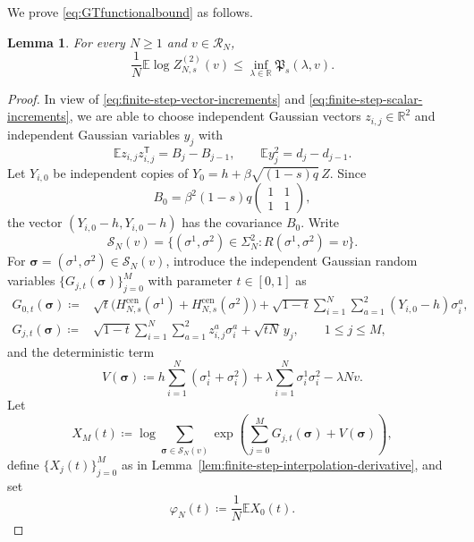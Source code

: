\documentclass[11pt]{article}
\newtheorem{lemma}[theorem]{Lemma}
\numberwithin{equation}{section}
\newcommand{\E}{\mathbb{E}}
\newcommand{\1}{\mathbf 1}
\begin{document}
We prove \eqref{eq:GTfunctionalbound} as follows.

\begin{lemma}
\label{lem:specialGT}
For every $N\geq1$ and $v\in\mathcal R_N$,
\begin{equation}
\frac1N\E\log Z_{N,s}^{(2)}(v)
\leq\inf_{\lambda\in\mathbb R}\mathfrak P_s(\lambda,v).
\label{eq:appendix-GT-infimum}
\end{equation}
\end{lemma}

\begin{proof}
In view of \eqref{eq:finite-step-vector-increments} and \eqref{eq:finite-step-scalar-increments}, we are able to choose independent Gaussian vectors $z_{i,j}\in\mathbb R^2$ and
independent Gaussian variables $y_j$ with
\begin{equation}\label{eq:covzy}
\E z_{i,j}z_{i,j}^{\mathsf T}=B_j-B_{j-1},
\qquad
\E y_j^2=d_j-d_{j-1}.
\end{equation}
Let $Y_{i,0}$ be independent copies of
$Y_0=h+\beta\sqrt{(1-s)q}\,Z$. Since
\[
B_0=\beta^2(1-s)q
\begin{pmatrix}1&1\\1&1\end{pmatrix},
\]
the vector $(Y_{i,0}-h,Y_{i,0}-h)$ has the covariance $B_0$.
Write
\[
{\mathcal{S}}_N(v)=\{(\sigma^1,\sigma^2)\in\Sigma_N^2:
R(\sigma^1,\sigma^2)=v\}.
\]
For $\boldsymbol\sigma=(\sigma^1,\sigma^2)\in{\mathcal{S}}_N(v)$, introduce
the independent Gaussian random variables $\{ G_{j,t}(\boldsymbol\sigma)\} _{j=0}^M$ with parameter $t \in [0,1]$ as
\begin{align*}
G_{0,t}(\boldsymbol\sigma)
\coloneqq {}&\sqrt t\bigl(H_{N,s}^{\mathrm{cen}}(\sigma^1)
+H_{N,s}^{\mathrm{cen}}(\sigma^2)\bigr)+\sqrt{1-t}\sum_{i=1}^N\sum_{a=1}^2
(Y_{i,0}-h)\sigma_i^a,\\
G_{j,t}(\boldsymbol\sigma)
\coloneqq {}&\sqrt{1-t}\sum_{i=1}^N\sum_{a=1}^2z_{i,j}^a\sigma_i^a
+\sqrt{tN}\,y_j,
\qquad 1\leq j\leq M,
\end{align*}
and the deterministic term
\[
V(\boldsymbol\sigma) \coloneqq h\sum_{i=1}^N(\sigma_i^1+\sigma_i^2)
+\lambda\sum_{i=1}^N\sigma_i^1\sigma_i^2-\lambda Nv.
\]
Let
\[
X_M(t) \coloneqq \log\sum_{\boldsymbol\sigma\in{\mathcal{S}}_N(v)}
\exp\left(\sum_{j=0}^MG_{j,t}(\boldsymbol\sigma)
+V(\boldsymbol\sigma)\right),
\]
define $\{ X_j(t)\} _{j=0}^M$ as in Lemma~\ref{lem:finite-step-interpolation-derivative},
and set
\[
\varphi_N(t) \coloneqq \frac1N\E X_0(t).
\]


\end{proof}
\end{document}
